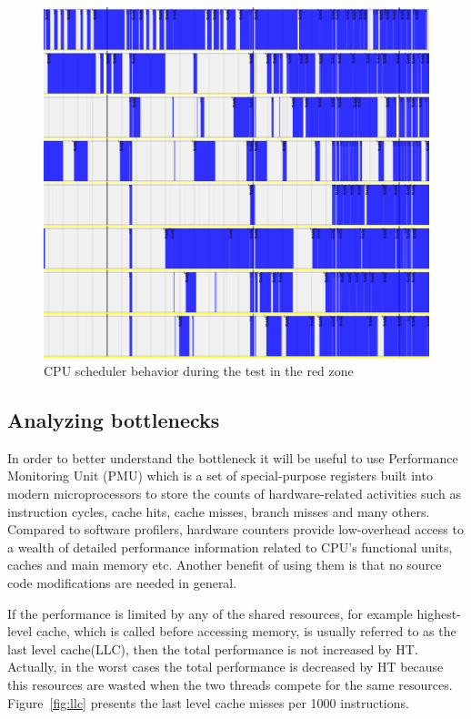 \documentclass[12pt]{article}
\begin{document}
\begin{figure}[h]
    \centering
	\includegraphics[scale=0.8]{images/scheduler.png}
	\caption{CPU scheduler behavior during the test in the red zone}
    \label{fig:sched}
\end{figure}

\subsection{Analyzing bottlenecks}

In order to better understand the bottleneck it will be useful to use Performance Monitoring Unit (PMU) which is a set of special-purpose registers built into modern microprocessors to store the counts of hardware-related activities such as instruction cycles, cache hits, cache misses, branch misses and many others. Compared to software profilers, hardware counters provide low-overhead access to a wealth of detailed performance information related to CPU's functional units, caches and main memory etc. Another benefit of using them is that no source code modifications are needed in general.

If the performance is limited by any of the shared resources, for example highest-level cache, which is called before accessing memory, is usually referred to as the last level cache(LLC), then the total performance is not increased by HT. Actually, in the worst cases the total performance is decreased by HT because this resources are wasted when the two threads compete for the same resources. Figure~\ref{fig:llc} presents the last level cache misses per 1000 instructions.
\end{document}
